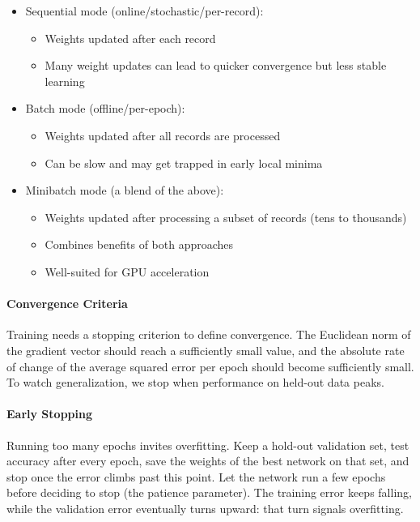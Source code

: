 \begin{itemize}
\item Sequential mode (online/stochastic/per-record):
  \begin{itemize}
  \item Weights updated after each record
  \item Many weight updates can lead to quicker convergence but less stable learning
  \end{itemize}
  
\item Batch mode (offline/per-epoch):
  \begin{itemize}
  \item Weights updated after all records are processed
  \item Can be slow and may get trapped in early local minima
  \end{itemize}
  
\item Minibatch mode (a blend of the above):
  \begin{itemize}
  \item Weights updated after processing a subset of records (tens to thousands)
  \item Combines benefits of both approaches
  \item Well-suited for GPU acceleration
  \end{itemize}
\end{itemize}

\paragraph{Convergence Criteria} Training needs a stopping criterion to define convergence. The Euclidean norm of the gradient vector should reach a sufficiently small value, and the absolute rate of change of the average squared error per epoch should become sufficiently small. To watch generalization, we stop when performance on held-out data peaks.

\paragraph{Early Stopping} Running too many epochs invites overfitting. Keep a hold-out validation set, test accuracy after every epoch, save the weights of the best network on that set, and stop once the error climbs past this point. Let the network run a few epochs before deciding to stop (the patience parameter). The training error keeps falling, while the validation error eventually turns upward: that turn signals overfitting.

